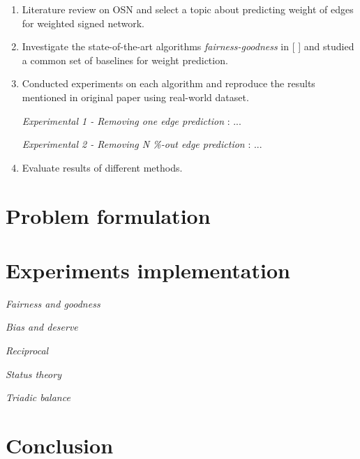 \documentclass{article}
\begin{document}
\begin{enumerate}
	\item Literature review on OSN and select a topic about predicting weight of edges for weighted signed network.
	
	\item Investigate the state-of-the-art algorithms \emph{fairness-goodness} in [ ] and  studied a common set of baselines for weight prediction.
	
	\item Conducted experiments on each algorithm and reproduce the results mentioned in original paper using real-world dataset.
	
	\emph{Experimental 1 -   Removing one edge prediction} : ...
	
	\emph{Experimental 2 -  Removing N \%-out edge prediction} : ...
	
	\item Evaluate results of different methods.
\end{enumerate}

\section{Problem formulation}

\section{Experiments implementation}

\emph{Fairness and goodness}




\emph{Bias and deserve}

\emph{Reciprocal}



\emph{Status theory}

\emph{Triadic balance}







\section{Conclusion}




\end{document}
